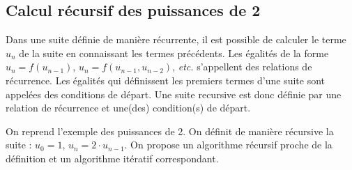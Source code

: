 \documentclass[10pt,fleqn]{article} %
\begin{document}
\subsection{Calcul récursif des puissances de 2}
Dans une suite définie de manière récurrente, il est possible de calculer le terme $u_n$ de la suite en connaissant les termes précédents.
Les égalités de la forme $u_n = f (u_{n-1})$, $u_n = f (u_{n-1}, u_{n-2})$, \textit{etc.} s’appellent des relations de récurrence.
Les égalités qui définissent les premiers termes d’une suite sont appelées des conditions de départ.
Une suite recursive est donc définie par une relation de récurrence et une(des) condition(s) de départ.


\begin{exemple}
On reprend l’exemple des puissances de 2. On définit de manière récursive la suite : $u_0=1$, $u_n = 2\cdot u_{n-1}$. On propose un algorithme récursif proche de la définition et un algorithme itératif correspondant.
\end{exemple}
\end{document}
